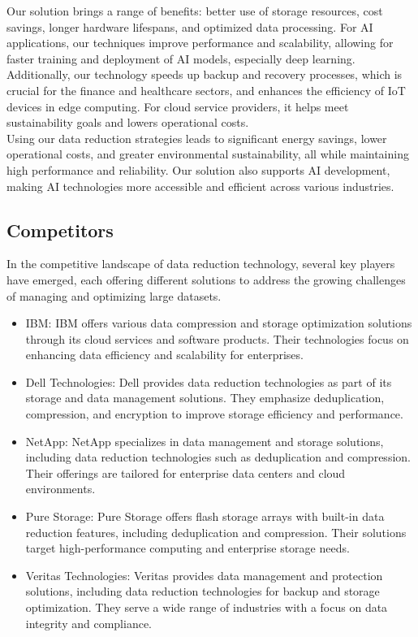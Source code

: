 Our solution brings a range of benefits: better use of storage resources, cost savings, longer hardware lifespans, and optimized data processing. For AI applications, our techniques improve performance and scalability, allowing for faster training and deployment of AI models, especially deep learning.\\

Additionally, our technology speeds up backup and recovery processes, which is crucial for the finance and healthcare sectors, and enhances the efficiency of IoT devices in edge computing. For cloud service providers, it helps meet sustainability goals and lowers operational costs.\\

Using our data reduction strategies leads to significant energy savings, lower operational costs, and greater environmental sustainability, all while maintaining high performance and reliability. Our solution also supports AI development, making AI technologies more accessible and efficient across various industries.

\subsection{Competitors}
In the competitive landscape of data reduction technology, several key players have emerged, each offering different solutions to address the growing challenges of managing and optimizing large datasets. 

\begin{itemize}
\item IBM: IBM offers various data compression and storage optimization solutions through its cloud services and software products. Their technologies focus on enhancing data efficiency and scalability for enterprises.

\item Dell Technologies: Dell provides data reduction technologies as part of its storage and data management solutions. They emphasize deduplication, compression, and encryption to improve storage efficiency and performance.

\item NetApp: NetApp specializes in data management and storage solutions, including data reduction technologies such as deduplication and compression. Their offerings are tailored for enterprise data centers and cloud environments.

\item Pure Storage: Pure Storage offers flash storage arrays with built-in data reduction features, including deduplication and compression. Their solutions target high-performance computing and enterprise storage needs.

\item Veritas Technologies: Veritas provides data management and protection solutions, including data reduction technologies for backup and storage optimization. They serve a wide range of industries with a focus on data integrity and compliance.
\end{itemize}


